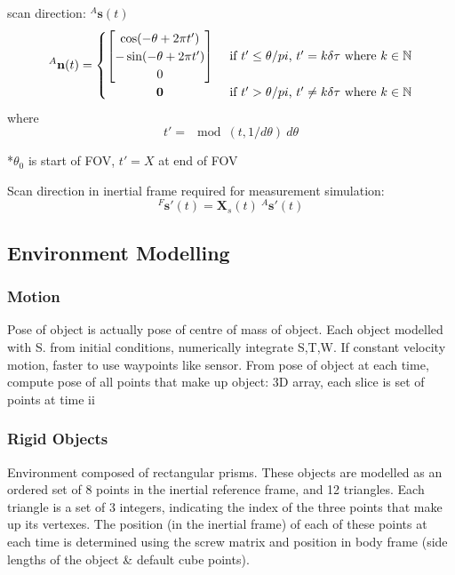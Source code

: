scan direction: $^{A}\mathbf{s}(t)$
\begin{equation}
^{A}\mathbf{n}(t) =
	\begin{cases} 
	      \hfill \begin{bmatrix}
	      		\cos(-\theta + 2\pi t') \\
	      		-\sin(-\theta + 2\pi t') \\
	      		0
	      	\end{bmatrix}    \hfill & \text{ if $t' \leq \theta/pi$, $t' = k\delta\tau$ where $k \in \mathbb{N}$} \\
	      \hfill \mathbf{0} \hfill & \text{ if $t' > \theta/pi$, $t' \neq k\delta\tau$ where $k \in \mathbb{N}$} \\
	\end{cases} 
\end{equation}
where
\begin{equation}
t' = \mod(t,1/d\theta)\:d\theta
\end{equation}

*$\theta_0$ is start of FOV, $t'=X$ at end of FOV

Scan direction in inertial frame required for measurement simulation:
\begin{equation}
	{^{F}\mathbf{s'}(t)} = \mathbf{X}_s(t)\:{^{A}\mathbf{s'}(t)}
\end{equation}

\subsection{Environment Modelling}
\subsubsection{Motion}
Pose of object is actually pose of centre of mass of object.
Each object modelled with S. from initial conditions, numerically integrate S,T,W. If constant velocity motion, faster to use waypoints like sensor.
From pose of object at each time, compute pose of all points that make up object: 3D array, each slice is set of points at time ii

\subsubsection{Rigid Objects}
Environment composed of rectangular prisms. These objects are modelled as an ordered set of 8 points in the inertial reference frame, and 12 triangles. Each triangle is a set of 3 integers, indicating the index of the three points that make up its vertexes.
The position (in the inertial frame) of each of these points at each time is determined using the screw matrix and position in body frame (side lengths of the object \& default cube points).


